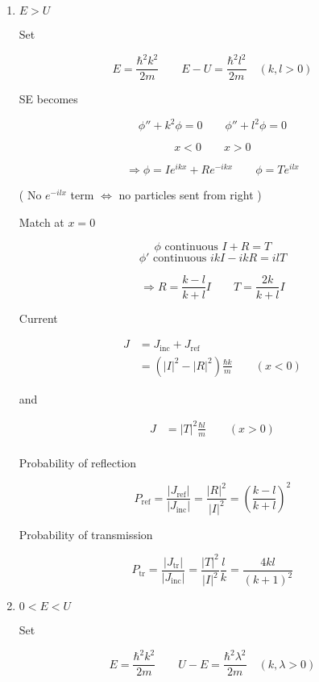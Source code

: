 \documentclass[a4paper]{article}
\begin{document}
	
\begin{enumerate}
	\item $ E > U $
	
	Set 
	
	\[ E = \frac{\hbar^{2} k^{2}}{2m}  \qquad E - U = \frac{\hbar^{2} l^{2}}{2m} \quad (k,l > 0) \]
	
	SE becomes
	
	\[ \phi'' + k^{2} \phi = 0 \qquad  \phi'' + l^{2} \phi = 0 \]
	
	\[ x < 0 \qquad x > 0 \]
	
	\[ \Rightarrow \phi = I e^{ikx} + R e^{-ikx}  \qquad \phi = T e^{ilx}   \]
	
	( No $ e^{-ilx} $ term $ \iff $ no particles sent from right )
	
	Match at $ x = 0 $
	
	\[ \phi \text{ continuous } I + R = T \]
	\[ \phi' \text{ continuous } ik I - i k R = i l T \]
	
	
	\[ \Rightarrow  R = \frac{k-l}{k+l} I \qquad T = \frac{2k}{k+l}I \]
	
	Current
	
	\begin{align*}
	J & = J_{\text{inc}} + J_{\text{ref}} \\
	& = (  | I |^{2} - | R |^{2}  ) \frac{\hbar k}{m}  \qquad (x < 0)
	\end{align*}
	
	
	
	and
	
	\begin{align*}
	J & = | T |^{2}  \frac{\hbar l}{m} \qquad (x > 0) \\
	\end{align*}	
	
	
	Probability of reflection 
	
	\[ P_{\text{ref}} = \frac{| J_{\text{ref}} |}{ | J_{\text{inc}} |} = \frac{|R|^{2}}{| I |^{2}} = \left(  \frac{k-l}{k+l} \right)^{2}  \]
	
	Probability of transmission
	
	\[ P_{\text{tr}} = \frac{| J_{\text{tr}} |}{ | J_{\text{inc}} |} = \frac{| T |^{2}}{| I |^{2}} \frac{l}{k}  = \frac{4kl}{(k+1)^{2}}  \]	
		
		
	\item $ 0 < E < U $
	
	
		Set 
	
	\[ E = \frac{\hbar^{2} k^{2}}{2m}  \qquad U - E = \frac{\hbar^{2} \lambda^{2}}{2m} \quad (k,\lambda > 0) \]
	

\end{enumerate}
\end{document}
